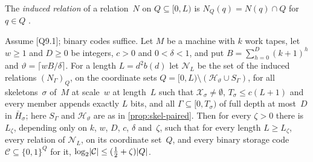 The \emph{induced relation} of a relation~$N$ on $Q\subseteq[0,L)$ is $N_Q(q)=N(q)\cap Q$ for $q\in Q$
\cite[Section~2]{DirectedRecovery2026}.

\begin{lemma}\label{lem:skel-uniform}
Assume [Q9.1]; binary codes suffice. Let $M$ be a machine with $k$ work tapes, let $w\ge1$ and $D\ge0$ be integers,
$c>0$ and $0<\delta<1$, and put $B=\sum_{h=0}^D(k+1)^h$ and $\vartheta=\lceil wB/\delta\rceil$. For a length
$L=d^2b(d)$ let $\mathcal N_L$ be the set of the induced relations $(N_\Gamma)_Q$, on the coordinate sets
$Q=[0,L)\setminus(\mathcal H_\vartheta\cup S_\Gamma)$, for all skeletons~$\sigma$ of~$M$ at scale~$w$ at length~$L$ such
that $\mathcal X_\sigma\ne\emptyset$, $T_\sigma\le c(L+1)$ and every member appends exactly $L$ bits, and all
$\Gamma\subseteq[0,T_\sigma)$ of full depth at most~$D$ in $\bar H_\sigma$; here $S_\Gamma$ and $\mathcal H_\vartheta$
are as in \cref{prop:skel-paired}. Then for every $\zeta>0$ there is~$L_\zeta$, depending only on $k$, $w$, $D$, $c$,
$\delta$ and~$\zeta$, such that for every length $L\ge L_\zeta$, every relation of $\mathcal N_L$, on its coordinate
set~$Q$, and every binary storage code $\mathcal C\subseteq\{0,1\}^Q$ for it, $\log_2\lvert \mathcal C \rvert\le(\frac12+\zeta)\lvert Q \rvert$.
\end{lemma}

